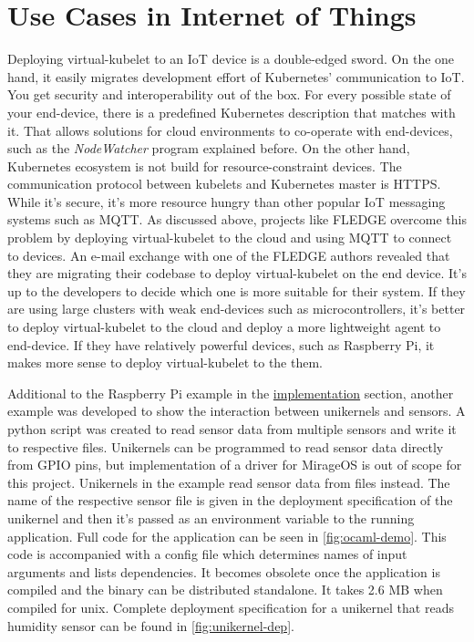 \pagebreak
\section{Use Cases in Internet of Things}

Deploying virtual-kubelet to an IoT device is a double-edged sword. On the one hand, it easily migrates development effort of Kubernetes' communication to IoT. You get security and interoperability out of the box. For every possible state of your end-device, there is a predefined Kubernetes description that matches with it. That allows solutions for cloud environments to co-operate with end-devices, such as the \textit{NodeWatcher} program explained before. On the other hand, Kubernetes ecosystem is not build for resource-constraint devices. The communication protocol between kubelets and Kubernetes master is HTTPS. While it's secure, it's more resource hungry than other popular IoT messaging systems such as MQTT. As discussed above, projects like FLEDGE overcome this problem by deploying virtual-kubelet to the cloud and using MQTT to connect to devices. An e-mail exchange with one of the FLEDGE authors revealed that they are migrating their codebase to deploy virtual-kubelet on the end device. It's up to the developers to decide which one is more suitable for their system. If they are using large clusters with weak end-devices such as microcontrollers, it's better to deploy virtual-kubelet to the cloud and deploy a more lightweight agent to end-device. If they have relatively powerful devices, such as Raspberry Pi, it makes more sense to deploy virtual-kubelet to the them.

Additional to the Raspberry Pi example in the \hyperref[chapter:implementation]{implementation} section, another example was developed to show the interaction between unikernels and sensors. A python script was created to read sensor data from multiple sensors and write it to respective files. Unikernels can be programmed to read sensor data directly from GPIO pins, but implementation of a driver for MirageOS is out of scope for this project. Unikernels in the example read sensor data from files instead. The name of the respective sensor file is given in the deployment specification of the unikernel and then it's passed as an environment variable to the running application. Full code for the application can be seen in \ref{fig:ocaml-demo}. This code is accompanied with a config file which determines names of input arguments and lists dependencies. It becomes obsolete once the application is compiled and the binary can be distributed standalone. It takes 2.6 MB when compiled for unix. Complete deployment specification for a unikernel that reads humidity sensor can be found in \ref{fig:unikernel-dep}.

